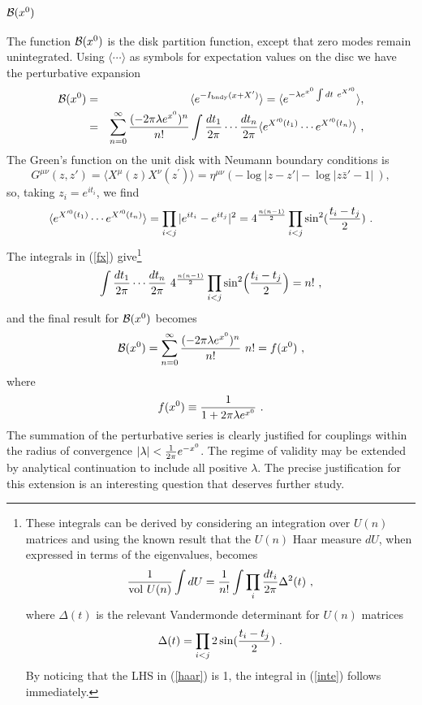 \documentclass[a4paper,12pt]{article}
\begin{document}
\subsubsection{${\cal B}(x^0)$}
The function ${\cal B}(x^0)$ is the disk partition function, except that zero modes remain
unintegrated. Using $\langle \cdots  \rangle $ as symbols for expectation values on
the disc we have the perturbative expansion
\begin{eqnarray}
{\cal B}(x^0)&=&  \langle e^{-I_{\rm bndy}(x+X^\prime)}\rangle = \langle e^{-\lambda e^{x^0} \int dt ~e^{X'^0}}\rangle, \\
&=& 
\sum_{n=0}^\infty {(-2\pi \lambda e^{x^0})^n \over n!} \int {dt_1  \over 2\pi} \cdots {dt_n \over 2 \pi}  \langle e^{X'^0(t_1)} \cdots e^{X'^0(t_n)} \rangle~, 
\label{fx}
\end{eqnarray}
The Green's function on the unit disk with Neumann boundary conditions is
\begin{equation}
G^{\mu \nu}(z, z')= \langle X^\mu(z) X^\nu(z^\prime)\rangle = 
\eta^{\mu \nu}(-\log|z-z'|-\log| z\bar{z}'-1|~), 
\label{green}
\end{equation}
so, taking $z_i=e^{it_i}$, we find
\begin{equation}
\langle e^{X'^0(t_1)} \cdots e^{X'^0(t_n)} \rangle = \prod_{i<j} |e^{it_i}-e^{it_j}|^2  
=4^{n(n-1)\over 2} \prod_{i<j}\sin^2 ({t_i - t_j \over 2})~.
\end{equation}
The integrals in (\ref{fx}) give\footnote{These integrals can be derived by considering
an integration over $U(n)$ matrices and using the known result that the $U(n)$ Haar 
measure $dU$, when expressed in terms of the eigenvalues, becomes
\begin{equation}
 {1 \over {\rm vol}~U(n)}\int dU = {1 \over n!} \int \prod_i {dt_i \over 2 \pi}  \Delta^2(t)~,
\label{haar}
\end{equation}
 where $\Delta(t)$ is the relevant Vandermonde determinant for $U(n)$ matrices
\begin{equation}
\Delta(t)=\prod_{i < j} 2 \sin({t_i -t_j \over 2})~.
\end{equation}
By noticing that the LHS in (\ref{haar}) is 1, the integral in (\ref{inte}) follows immediately. 
}
\begin{equation}
 \int {dt_1  \over 2\pi} \cdots {dt_n \over 2 \pi}~4^{n(n-1)\over 2}
\prod_{i< j} \sin^2\Bigl({t_i - t_j \over 2}\Bigr) = n!~,
\label{inte}
\end{equation}
and the final result for ${\cal B}(x^0)$ becomes
\begin{equation}
{\cal B}(x^0)= \sum_{n=0}^\infty {(-2\pi \lambda e^{x^0})^n \over n!}  ~n! =
 f(x^0)~,
\end{equation}
where
\begin{equation}
 f(x^0)\equiv {1 \over 1 + 2\pi \lambda e^{x^0}} ~.
\end{equation}
The summation of the perturbative series is clearly justified for couplings within the radius of 
convergence $|\lambda|< {1\over 2\pi}e^{-x^0}$. The regime of validity may be extended 
by analytical continuation to include all positive $\lambda$. The precise justification
for this extension is an interesting question that deserves further study.
\end{document}
